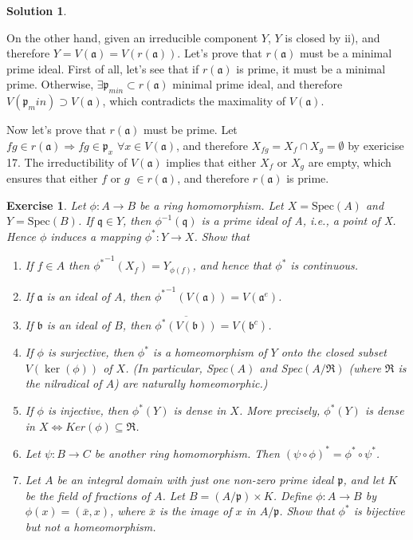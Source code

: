 \documentclass[12pt]{article}
\newcommand{\imp}{\ensuremath{\Rightarrow}}
\newcommand{\ip}{\ensuremath{\mathfrak{p}}}
\newcommand{\iq}{\ensuremath{\mathfrak{q}}}
\newcommand{\ia}{\ensuremath{\mathfrak{a}}}
\newcommand{\ib}{\ensuremath{\mathfrak{b}}}
\newcommand*\closure[1]{\overline{#1}}
\newtheorem{ex}{Exercise}[section]
\theoremstyle{definition}
\newtheorem*{sol}{Solution}
\begin{document}
\begin{sol}
\begin{enumerate}[label=(\roman*)]
		On the other hand, given an irreducible component $Y$, $Y$ is closed by ii), and therefore $Y = V(\ia) = V(r(\ia))$. Let's prove that $r(\ia)$ must be a minimal prime ideal. First of all, let's see that if $r(\ia)$ is prime, it must be a minimal prime. Otherwise, $\exists \ip_{min} \subset r(\ia)$ minimal prime ideal, and therefore $V(\ip_min) \supset V(\ia)$, which contradicts the maximality of $V(\ia)$. 

		Now let's prove that $r(\ia)$ must be prime. Let $fg \in r(\ia) \imp fg \in \ip_x \, \, \forall x \in V(\ia)$, and therefore $X_{fg} = X_f \cap X_g = \emptyset$ by exericise 17. The irreductibility of $V(\ia)$ implies that either $X_f$ or $X_g$ are empty, which ensures that either $f$ or $g$ $\in r(\ia)$, and therefore $r(\ia)$ is prime.
\end{enumerate}
\end{sol}

\begin{ex}
	Let $\phi: A \to B$ be a ring homomorphism. Let $X = \text{Spec}(A)$ and $Y = \text{Spec}(B)$. If $\iq \in Y$, then $\phi^{-1}(\iq)$ is a prime ideal of A, i.e., a point of X. Hence $\phi$ induces a mapping $\phi^*: Y \to X$. Show that
	\begin{enumerate}[label=(\roman*)]
		\item If $f \in A$ then ${\phi^*}^{-1}(X_f) = Y_{\phi(f)}$, and hence that $\phi^*$ is continuous.
		\item If $\ia$ is an ideal of $A$, then ${\phi^*}^{-1}(V(\ia)) = V(\ia^e)$.
		\item If $\ib$ is an ideal of $B$, then $\closure{\phi^*(V(\ib))} = V(\ib^c)$.
		\item If $\phi$ is surjective, then $\phi^*$ is a homeomorphism of $Y$ onto the closed subset $V(\ker(\phi))$ of $X$. (In particular, Spec$(A)$ and Spec$(A/\mathfrak{R})$ (where $\mathfrak{R}$ is the nilradical of $A$) are naturally homeomorphic.)
		\item If $\phi$ is injective, then $\phi^*(Y)$ is dense in $X$. More precisely, $\phi^*(Y)$ is dense in $X \iff Ker(\phi) \subseteq \mathfrak{R}$.
		\item Let $\psi: B \to C$ be another ring homomorphism. Then $(\psi \circ \phi)^* = \phi^* \circ \psi^*$.
		\item Let $A$ be an integral domain with just one non-zero prime ideal $\ip$, and let $K$ be the field of fractions of $A$. Let $B = (A/\ip) \times K$. Define $\phi: A \to B$ by $\phi(x) = (\bar{x}, x)$, where $\bar{x}$ is the image of $x$ in $A/\ip$. Show that $\phi^*$ is bijective but not a homeomorphism.
	\end{enumerate}
\end{ex}
\end{document}
